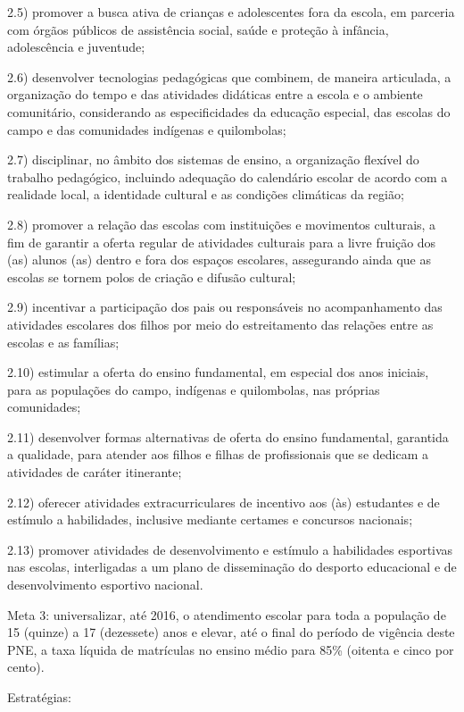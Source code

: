 \documentclass[
]{book}
\begin{document}
2.5) promover a busca ativa de crianças e adolescentes fora da escola, em parceria com órgãos públicos de assistência social, saúde e proteção à infância, adolescência e juventude;

2.6) desenvolver tecnologias pedagógicas que combinem, de maneira articulada, a organização do tempo e das atividades didáticas entre a escola e o ambiente comunitário, considerando as especificidades da educação especial, das escolas do campo e das comunidades indígenas e quilombolas;

2.7) disciplinar, no âmbito dos sistemas de ensino, a organização flexível do trabalho pedagógico, incluindo adequação do calendário escolar de acordo com a realidade local, a identidade cultural e as condições climáticas da região;

2.8) promover a relação das escolas com instituições e movimentos culturais, a fim de garantir a oferta regular de atividades culturais para a livre fruição dos (as) alunos (as) dentro e fora dos espaços escolares, assegurando ainda que as escolas se tornem polos de criação e difusão cultural;

2.9) incentivar a participação dos pais ou responsáveis no acompanhamento das atividades escolares dos filhos por meio do estreitamento das relações entre as escolas e as famílias;

2.10) estimular a oferta do ensino fundamental, em especial dos anos iniciais, para as populações do campo, indígenas e quilombolas, nas próprias comunidades;

2.11) desenvolver formas alternativas de oferta do ensino fundamental, garantida a qualidade, para atender aos filhos e filhas de profissionais que se dedicam a atividades de caráter itinerante;

2.12) oferecer atividades extracurriculares de incentivo aos (às) estudantes e de estímulo a habilidades, inclusive mediante certames e concursos nacionais;

2.13) promover atividades de desenvolvimento e estímulo a habilidades esportivas nas escolas, interligadas a um plano de disseminação do desporto educacional e de desenvolvimento esportivo nacional.

Meta 3: universalizar, até 2016, o atendimento escolar para toda a população de 15 (quinze) a 17 (dezessete) anos e elevar, até o final do período de vigência deste PNE, a taxa líquida de matrículas no ensino médio para 85\% (oitenta e cinco por cento).

Estratégias:
\end{document}
